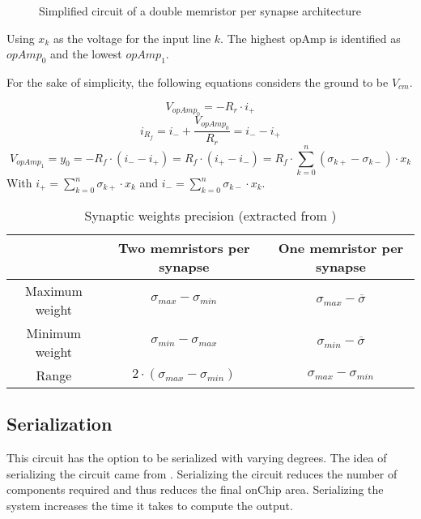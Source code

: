 \begin{figure}[H]
  \centering
  
  \caption{Simplified circuit of a double memristor per synapse architecture}
  \label{circt:doubleMem}
\end{figure}

Using $x_k$ as the voltage for the input line $k$. The highest \ac{opAmp} is identified as $opAmp_0$ and the lowest $opAmp_1$.

For the sake of simplicity, the following equations considers the ground to be $V_{cm}$.

\begin{equation}
  \label{eq:doubleMem0}
  V_{opAmp_0}=-R_r\cdot i_+
\end{equation}
\begin{equation}
  \label{eq:doubleMem1}
  i_{R_f}=i_-+\frac{V_{opAmp_0}}{R_r}=i_--i_+
\end{equation}
\begin{equation}
  \label{eq:doubleMem2}
  V_{opAmp_1}=y_0=-R_f\cdot(i_--i_+)=R_f\cdot(i_+-i_-)=R_f\cdot\sum_{k=0}^n(\sigma_{k+}-\sigma_{k-})\cdot x_k
\end{equation}
With $i_+=\sum_{k=0}^n\sigma_{k+}\cdot x_k$ and $i_-=\sum_{k=0}^n\sigma_{k-}\cdot x_k$.


\begin{table}[H]
  \centering
  \begin{tabular}{|c|c|c|}
    \cline{2-3}
    \rowcolor{gray}
    \multicolumn{1}{c|}{\cellcolor[HTML]{FFFFFF}} & Two memristors per synapse & One memristor per synapse \\
    \hline
    Maximum weight & $\sigma_{max}-\sigma_{min}$ & $\sigma_{max} -\overline{\sigma}$\\
    \hline
    Minimum weight & $\sigma_{min}-\sigma_{max}$ & $\sigma_{min} -\overline{\sigma}$\\
    \hline
    Range & $2\cdot(\sigma_{max}-\sigma_{min})$&$\sigma_{max}-\sigma_{min}$\\
    \hline
  \end{tabular}
  \caption{Synaptic weights precision (extracted from \cite{doubleMem})}
  \label{tab:synapses}
\end{table}

\subsection{Serialization}
\label{subsec:serpar}

This circuit has the option to be serialized with varying degrees. The idea of serializing the circuit came from \cite{thesisRef}. Serializing the circuit reduces the number of components required and thus reduces the final onChip area. Serializing the system increases the time it takes to compute the output.

